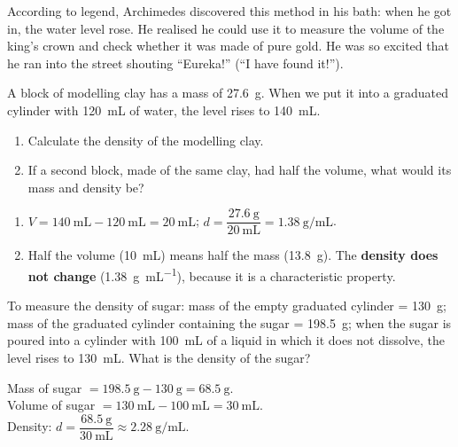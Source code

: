 \begin{didyouknow}
    According to legend, Archimedes discovered this method in his bath: when he got in, the water level rose. He realised he could use it to measure the volume of the king's crown and check whether it was made of pure gold. He was so excited that he ran into the street shouting ``Eureka!'' (``I have found it!'').
\end{didyouknow}

\begin{exercise}
    A block of modelling clay has a mass of \qty{27.6}{\g}. When we put it into a graduated cylinder with \qty{120}{\mL} of water, the level rises to \qty{140}{\mL}.
    \begin{enumerate}[label=\letraminuscula]
        \item Calculate the density of the modelling clay.
        \item If a second block, made of the same clay, had half the volume, what would its mass and density be?
    \end{enumerate}
    \begin{solu}
        \begin{enumerate}[label=\alph*)]
            \item \(V = \qty{140}{\mL} - \qty{120}{\mL} = \qty{20}{\mL}\); \(d = \dfrac{\qty{27.6}{\g}}{\qty{20}{\mL}} = \qty{1.38}{\g\per\mL}\).
            \item Half the volume (\qty{10}{\mL}) means half the mass (\qty{13.8}{\g}). The \textbf{density does not change} (\qty{1.38}{\g\per\mL}), because it is a characteristic property.
        \end{enumerate}
    \end{solu}
\end{exercise}

\begin{exercise}
    To measure the density of sugar: mass of the empty graduated cylinder = \qty{130}{\g}; mass of the graduated cylinder containing the sugar = \qty{198.5}{\g}; when the sugar is poured into a cylinder with \qty{100}{\mL} of a liquid in which it does not dissolve, the level rises to \qty{130}{\mL}. What is the density of the sugar?
    \begin{solu}
        Mass of sugar \(= \qty{198.5}{\g} - \qty{130}{\g} = \qty{68.5}{\g}\). \\
        Volume of sugar \(= \qty{130}{\mL} - \qty{100}{\mL} = \qty{30}{\mL}\). \\
        Density: \(d = \dfrac{\qty{68.5}{\g}}{\qty{30}{\mL}} \approx \qty{2.28}{\g\per\mL}\).
    \end{solu}
\end{exercise}

